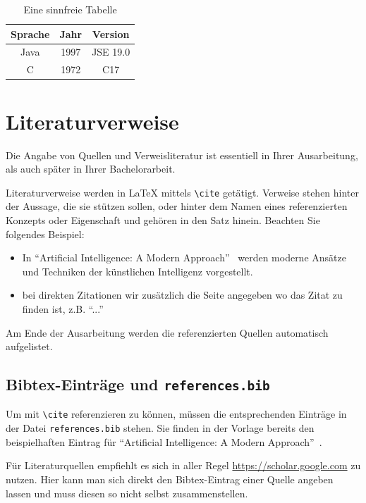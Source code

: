 \documentclass{hhuarticle}
\begin{document}
\begin{table}[h!]
\centering
\begin{tabular}{ |c|c|c| } 
 \hline
 Sprache & Jahr & Version \\ 
\hline
 Java & 1997 & JSE 19.0 \\ 
 C & 1972 & C17 \\ 
 \hline
\end{tabular}
\caption{Eine sinnfreie Tabelle}
\label{table:1}
\end{table}

  \section{Literaturverweise}

  Die Angabe von Quellen und Verweisliteratur ist essentiell in Ihrer
  Ausarbeitung,
  als auch später in Ihrer Bachelorarbeit.

  Literaturverweise werden in \LaTeX{} mittels
  \texttt{\textbackslash cite} getätigt.
  Verweise stehen hinter der Aussage, die sie stützen sollen,
  oder hinter dem Namen eines referenzierten Konzepts oder Eigenschaft
  und gehören in den Satz hinein.
  Beachten Sie folgendes Beispiel:
  \begin{itemize}
    \item In ``Artificial Intelligence: A Modern Approach''~\cite{russell2002artificial}
      werden moderne Ansätze und Techniken
      der künstlichen Intelligenz vorgestellt.
    \item bei direkten Zitationen wir zusätzlich die Seite angegeben wo das Zitat zu finden ist, z.B. ``...''~\cite[p.1]{russell2002artificial}
  \end{itemize}

  Am Ende der Ausarbeitung werden die referenzierten Quellen automatisch
  aufgelistet.

  \subsection{Bibtex-Einträge und \texttt{references.bib}}

  Um mit \texttt{\textbackslash cite} referenzieren zu können,
  müssen die entsprechenden Einträge in der Datei \texttt{references.bib}
  stehen.
  Sie finden in der Vorlage bereits den beispielhaften Eintrag für
  ``Artificial Intelligence: A Modern Approach''~\cite{russell2002artificial}.

  Für Literaturquellen empfiehlt es sich in aller Regel
  \url{https://scholar.google.com} zu nutzen.
  Hier kann man sich direkt den Bibtex-Eintrag einer Quelle
  angeben lassen und muss diesen so nicht selbst zusammenstellen.
\end{document}
